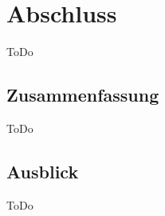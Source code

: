 \section{Abschluss}
\label{sec:conclusion}
ToDo

\subsection{Zusammenfassung}
\label{sec:summary}
ToDo

\subsection{Ausblick}
\label{subsec:futureWork}
ToDo